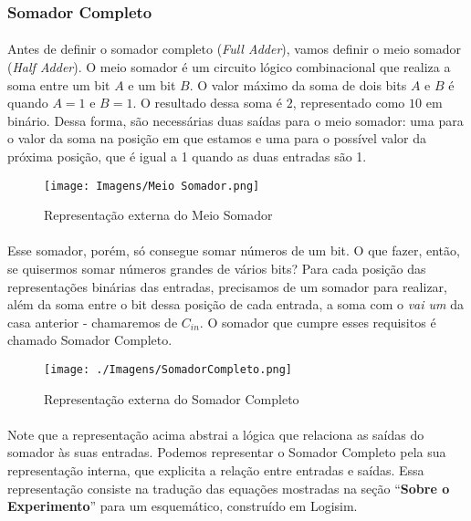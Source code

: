 \documentclass[a4paper,12pt]{article}
\begin{document}
\subsubsection{Somador Completo}
\paragraph{}
Antes de definir o somador completo (\textit{Full Adder}), vamos definir o meio somador (\textit{Half Adder}). O meio somador é um circuito lógico combinacional que realiza a soma entre um bit $A$ e um bit $B$. O valor máximo da soma de dois bits $A$ e $B$ é quando $A = 1$ e $B = 1$. O resultado dessa soma é $2$, representado como $10$ em binário. Dessa forma, são necessárias duas saídas para o meio somador: uma para o valor da soma na posição em que estamos e uma para o possível valor da próxima posição, que é igual a 1 quando as duas entradas são 1.

\begin{figure}[H]
    \centering
    \texttt{[image: Imagens/Meio Somador.png]}
    \caption{Representação externa do Meio Somador}
\end{figure}

\paragraph{}
Esse somador, porém, só consegue somar números de um bit. O que fazer, então, se quisermos somar números grandes de vários bits? Para cada posição das representações binárias das entradas, precisamos de um somador para realizar, além da soma entre o bit dessa posição de cada entrada, a soma com o \textit{vai um} da casa anterior - chamaremos de $C_{in}$. O somador que cumpre esses requisitos é chamado Somador Completo.

\begin{figure}[H]
    \centering
    \texttt{[image: ./Imagens/SomadorCompleto.png]}
    \caption{Representação externa do Somador Completo}
    \label{fig:somador_externa}
\end{figure}

\paragraph{}
Note que a representação acima abstrai a lógica que relaciona as saídas do somador às suas entradas. Podemos representar o Somador Completo pela sua representação interna, que explicita a relação entre entradas e saídas. Essa representação consiste na tradução das equações mostradas na seção ``\textbf{Sobre o Experimento}'' para um esquemático, construído em Logisim.
\end{document}
